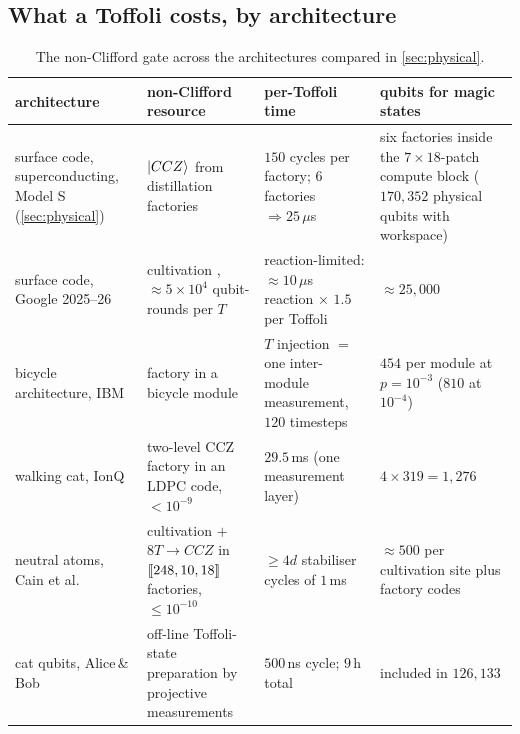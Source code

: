 \subsection{What a Toffoli costs, by architecture}
\begin{table}[H]
\centering\footnotesize
\setlength{\tabcolsep}{4pt}
\begin{tabular}{@{}p{3.6cm}p{3.5cm}p{3.6cm}p{4.8cm}@{}}
\toprule
architecture & non-Clifford resource & per-Toffoli time & qubits for magic states\\
\midrule
surface code, superconducting, Model S (\cref{sec:physical}) & $\lvert CCZ \rangle$ from distillation factories \cite{gidney-fowler19ccz} & $150$ cycles per factory; $6$ factories $\Rightarrow25\,\mu$s & six factories inside the $7\times18$-patch compute block ($170{,}352$ physical qubits with workspace)\\
surface code, Google 2025--26 \cite{gidney25rsa,babbush26} & cultivation \cite{cultivation24}, $\approx5\times10^4$ qubit-rounds per $T$ & reaction-limited: $\approx10\,\mu$s reaction $\times$ $1.5$ per Toffoli & $\approx25{,}000$\\
bicycle architecture, IBM \cite{yoder25tour} & factory in a bicycle module & $T$ injection $=$ one inter-module measurement, $120$ timesteps & $454$ per module at $p=10^{-3}$ ($810$ at $10^{-4}$)\\
walking cat, IonQ \cite{walkingcat26,haener26} & two-level CCZ factory in an LDPC code, $<10^{-9}$ & $29.5$\,ms (one measurement layer) & $4\times319=1{,}276$\\
neutral atoms, Cain et al.\ \cite{cain26} & cultivation $+$ $8T\to CCZ$ in $[\![248,10,18]\!]$ factories, $\le10^{-10}$ & $\ge4d$ stabiliser cycles of $1$\,ms & $\approx500$ per cultivation site plus factory codes\\
cat qubits, Alice\,\&\,Bob \cite{gouzien23} & off-line Toffoli-state preparation by projective measurements & $500$\,ns cycle; $9$\,h total & included in $126{,}133$\\
\bottomrule
\end{tabular}
\caption{The non-Clifford gate across the architectures compared in \cref{sec:physical}.}
\label{tab:toffoli-arch}
\end{table}
